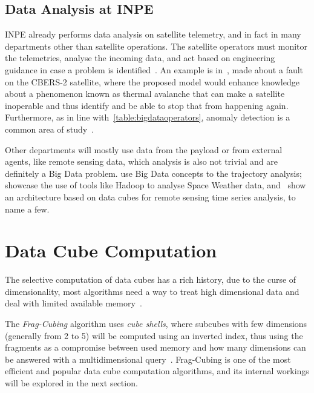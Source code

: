 \subsection{Data Analysis at INPE}\label{ch:corr:inpe}

INPE already performs data analysis on satellite telemetry, and in fact in many departments other than satellite operations.
The satellite operators must monitor the telemetries, analyse the incoming data, and act based on engineering guidance in case a problem is identified~\cite{TominagaFerrAmbr:2017:CoSaTe}.
An example is in~, made about a fault on the CBERS-2 satellite, where the proposed model would enhance knowledge about a phenomenon known as thermal avalanche that can make a satellite inoperable and thus identify and be able to stop that from happening again.
Furthermore, as in line with~\autoref{table:bigdataoperators}, anomaly detection is a common area of study~\cite{AzevedoAmbrViei::EsSoTe}.

Other departments will mostly use data from the payload or from external agents, like remote sensing data, which analysis is also not trivial and are definitely a Big Data problem.
 use Big Data concepts to the trajectory analysis;~ showcase the use of tools like Hadoop to analyse Space Weather data, and~ show an architecture based on data cubes for remote sensing time series analysis, to name a few.

\section{Data Cube Computation}\label{ch:corr:cube}

The selective computation of data cubes has a rich history, due to the curse of dimensionality, most algorithms need a way to treat high dimensional data and deal with limited available memory~\cite{hanDataMiningConcepts2011}.

The \textit{Frag-Cubing} algorithm uses \textit{cube shells}, where subcubes with few dimensions (generally from 2 to 5) will be computed using an inverted index, thus using the fragments as a compromise between used memory and how many dimensions can be answered with a multidimensional query~\cite{liHighdimensionalOLAPMinimal2004}.
Frag-Cubing is one of the most efficient and popular data cube computation algorithms, and its internal workings will be explored in the next section.

